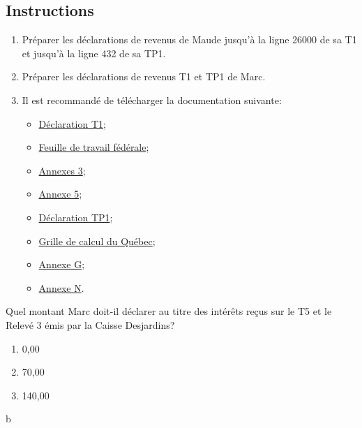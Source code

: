 \subsection{Instructions}
\begin{enumerate}
	\item Préparer les déclarations de revenus de Maude jusqu'à la ligne 26000 de sa T1 et jusqu'à la ligne 432 de sa TP1.
	\item Préparer les déclarations de revenus T1 et TP1 de Marc.
	\item Il est recommandé de télécharger la documentation suivante:
	\begin{itemize}
		\item \href{https://www.canada.ca/fr/agence-revenu/services/formulaires-publications/trousses-impot-toutes-annees-imposition/trousse-generale-impot-prestations/quebec/5005-r.html}{Déclaration T1};
		\item \href{https://www.canada.ca/fr/agence-revenu/services/formulaires-publications/trousses-impot-toutes-annees-imposition/trousse-generale-impot-prestations/5000-d1.html}{Feuille de travail fédérale};
		\item \href{https://www.canada.ca/fr/agence-revenu/services/formulaires-publications/trousses-impot-toutes-annees-imposition/trousse-generale-impot-prestations/5000-s3.html}{Annexes 3};
		\item \href{https://www.canada.ca/fr/agence-revenu/services/formulaires-publications/trousses-impot-toutes-annees-imposition/trousse-generale-impot-prestations/5000-s5.html}{Annexe 5};
		\item \href{https://www.revenuquebec.ca/documents/fr/formulaires/tp/2023-12/TP-1.D%282023-12%29.pdf}{Déclaration TP1};
		\item \href{https://www.revenuquebec.ca/documents/fr/formulaires/tp/2023-12/TP-1.D.GR%282023-12%29.pdf}{Grille de calcul du Québec};
		\item \href{https://www.revenuquebec.ca/documents/fr/formulaires/tp/2023-12/TP-1.D.G%282023-12%29.pdf}{Annexe G};
		\item \href{https://www.revenuquebec.ca/documents/fr/formulaires/tp/2023-12/TP-1.D.N%282023-12%29.pdf}{Annexe N}.
	\end{itemize}
\end{enumerate}

\setcounter{question}{0}
\begin{question}
	Quel montant Marc doit-il déclarer au titre des intérêts reçus sur le T5 et le Relevé 3 émis par la Caisse Desjardins?
	\begin{enumerate}[label=\alph*)]
		\item 0,00
		\item 70,00
		\item 140,00
	\end{enumerate}
\end{question}
b

